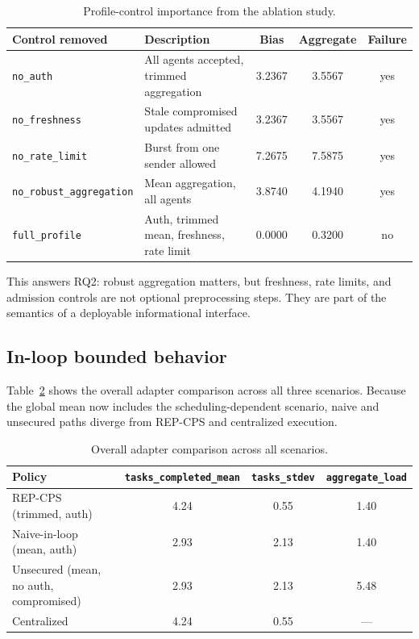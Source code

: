 \documentclass[11pt]{article}
\newcommand{\repcps}{REP-CPS}
\newcommand{\field}[1]{\texttt{#1}}
\begin{document}
\begin{table}[H]
\centering
\caption{Profile-control importance from the ablation study.}
\label{tab:ablation}
\begin{tabular}{p{2.8cm}p{5.2cm}ccc}
\toprule
Control removed & Description & Bias & Aggregate & Failure \\
\midrule
\field{no\_auth} & All agents accepted, trimmed aggregation & 3.2367 & 3.5567 & yes \\
\field{no\_freshness} & Stale compromised updates admitted & 3.2367 & 3.5567 & yes \\
\field{no\_rate\_limit} & Burst from one sender allowed & 7.2675 & 7.5875 & yes \\
\field{no\_robust\_aggregation} & Mean aggregation, all agents & 3.8740 & 4.1940 & yes \\
\field{full\_profile} & Auth, trimmed mean, freshness, rate limit & 0.0000 & 0.3200 & no \\
\bottomrule
\end{tabular}
\end{table}

This answers RQ2: robust aggregation matters, but freshness, rate limits, and admission controls are not optional preprocessing steps. They are part of the semantics of a deployable informational interface.

\subsection{In-loop bounded behavior}

Table~\ref{tab:overall} shows the overall adapter comparison across all three scenarios. Because the global mean now includes the scheduling-dependent scenario, naive and unsecured paths diverge from \repcps{} and centralized execution.

\begin{table}[H]
\centering
\caption{Overall adapter comparison across all scenarios.}
\label{tab:overall}
\begin{tabular}{lccc}
\toprule
Policy & \field{tasks\_completed\_mean} & \field{tasks\_stdev} & \field{aggregate\_load} \\
\midrule
\repcps{} (trimmed, auth) & 4.24 & 0.55 & 1.40 \\
Naive-in-loop (mean, auth) & 2.93 & 2.13 & 1.40 \\
Unsecured (mean, no auth, compromised) & 2.93 & 2.13 & 5.48 \\
Centralized & 4.24 & 0.55 & --- \\
\bottomrule
\end{tabular}
\end{table}
\end{document}
